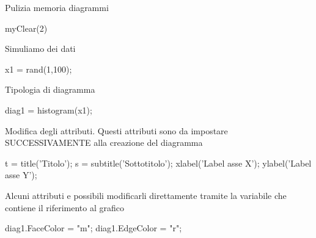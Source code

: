 
\begin{par}
\begin{flushleft}
Pulizia memoria diagrammi
\end{flushleft}
\end{par}

\begin{matlabcode}
myClear(2)
\end{matlabcode}

\begin{par}
\begin{flushleft}
Simuliamo dei dati
\end{flushleft}
\end{par}

\begin{matlabcode}
x1 = rand(1,100);
\end{matlabcode}

\begin{par}
\begin{flushleft}
Tipologia di diagramma
\end{flushleft}
\end{par}

\begin{matlabcode}
diag1 = histogram(x1);
\end{matlabcode}

\begin{par}
\begin{flushleft}
Modifica degli attributi. Questi attributi sono da impostare SUCCESSIVAMENTE  alla creazione del diagramma 
\end{flushleft}
\end{par}

\begin{matlabcode}
t = title('Titolo');
s = subtitle('Sottotitolo');
xlabel('Label asse X');
ylabel('Label asse Y');
\end{matlabcode}

\begin{par}
\begin{flushleft}
Alcuni attributi e possibili modificarli direttamente tramite la variabile che contiene il 
riferimento al grafico
\end{flushleft}
\end{par}

\begin{matlabcode}
diag1.FaceColor = "m"; %
diag1.EdgeColor = "r"; %
\end{matlabcode}

